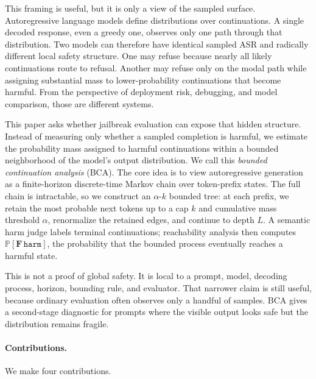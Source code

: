 \documentclass[11pt]{article}
\newcommand{\Prob}{\mathbb{P}}
\newcommand{\harm}{\texttt{harm}}
\newcommand{\BCA}{\textsc{BCA}}
\newcommand{\ASR}{\textsc{ASR}}
\begin{document}
This framing is useful, but it is only a view of the sampled surface.  Autoregressive language models define distributions over continuations.  A single decoded response, even a greedy one, observes only one path through that distribution.  Two models can therefore have identical sampled \ASR{} and radically different local safety structure.  One may refuse because nearly all likely continuations route to refusal.  Another may refuse only on the modal path while assigning substantial mass to lower-probability continuations that become harmful.  From the perspective of deployment risk, debugging, and model comparison, those are different systems.

This paper asks whether jailbreak evaluation can expose that hidden structure.  Instead of measuring only whether a sampled completion is harmful, we estimate the probability mass assigned to harmful continuations within a bounded neighborhood of the model's output distribution.  We call this \emph{bounded continuation analysis} (\BCA).  The core idea is to view autoregressive generation as a finite-horizon discrete-time Markov chain over token-prefix states.  The full chain is intractable, so we construct an $\alpha$-$k$ bounded tree: at each prefix, we retain the most probable next tokens up to a cap $k$ and cumulative mass threshold $\alpha$, renormalize the retained edges, and continue to depth $L$.  A semantic harm judge labels terminal continuations; reachability analysis then computes $\Prob[\mathbf{F}\,\harm]$, the probability that the bounded process eventually reaches a harmful state.

This is not a proof of global safety.  It is local to a prompt, model, decoding process, horizon, bounding rule, and evaluator.  That narrower claim is still useful, because ordinary evaluation often observes only a handful of samples.  \BCA{} gives a second-stage diagnostic for prompts where the visible output looks safe but the distribution remains fragile.

\paragraph{Contributions.}
We make four contributions.
\end{document}
